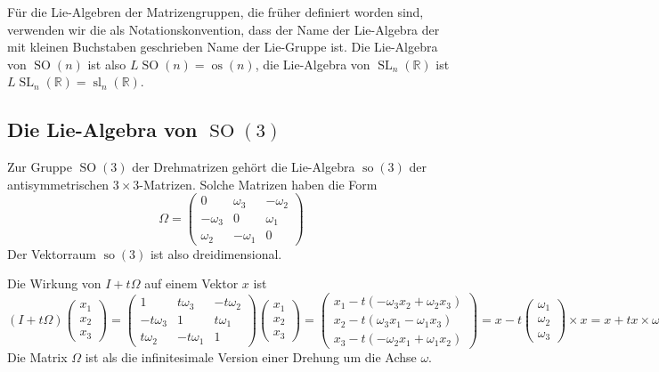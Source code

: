 Für die Lie-Algebren der Matrizengruppen, die früher definiert worden
sind, verwenden wir die als Notationskonvention, dass der Name der
Lie-Algebra der mit kleinen Buchstaben geschrieben Name der Lie-Gruppe ist.
Die Lie-Algebra von $\operatorname{SO}(n)$ ist also
$L\operatorname{SO}(n) = \operatorname{os}(n)$,
die Lie-Algebra von $\operatorname{SL}_n(\mathbb{R})$ ist
$L\operatorname{SL}_n(\mathbb{R})=\operatorname{sl}_n(\mathbb{R})$.


%
%
\subsection{Die Lie-Algebra von $\operatorname{SO}(3)$
\label{buch:subsection:die-lie-algebra-von-so3}}
Zur Gruppe $\operatorname{SO}(3)$ der Drehmatrizen gehört die Lie-Algebra
$\operatorname{so}(3)$ der antisymmetrischen $3\times 3$-Matrizen.
Solche Matrizen haben die Form
\[
\Omega
=
\begin{pmatrix}
    0    & \omega_3&-\omega_2\\
-\omega_3&   0     & \omega_1\\
 \omega_2&-\omega_1&    0
\end{pmatrix}
\]
Der Vektorraum $\operatorname{so}(3)$ ist also dreidimensional.

Die Wirkung von $I+t\Omega$ auf einem Vektor $x$ ist
\[
(I+t\Omega)
\begin{pmatrix}x_1\\x_2\\x_3\end{pmatrix}
=
\begin{pmatrix}
    1     & t\omega_3&-t\omega_2\\
-t\omega_3&   1      & t\omega_1\\
 t\omega_2&-t\omega_1&    1
\end{pmatrix}
\begin{pmatrix}x_1\\x_2\\x_3\end{pmatrix}
=
\begin{pmatrix}
x_1-t(-\omega_3x_2+\omega_2x_3)\\
x_2-t( \omega_3x_1-\omega_1x_3)\\
x_3-t(-\omega_2x_1+\omega_1x_2)
\end{pmatrix}
=
x- t\begin{pmatrix}\omega_1\\\omega_2\\\omega_3\end{pmatrix}\times x
=
x+ tx\times \omega.
\]
Die Matrix $\Omega$ ist als die infinitesimale Version einer Drehung
um die Achse $\omega$.


